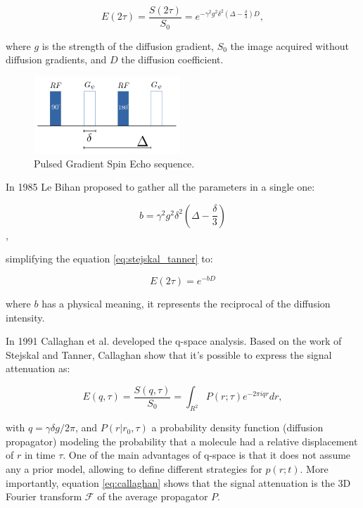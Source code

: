 \begin{equation}
    E(2\tau) = 
    \frac{S(2\tau)}{S_0} =
    e^{-\gamma^2 g^2 \delta^2 \left(\Delta - \frac{\delta}{3}\right) D},
\label{eq:stejskal_tanner}
\end{equation}

where $g$ is the strength of the diffusion gradient, $S_0$ the
image acquired without diffusion gradients, and $D$ the diffusion coefficient.

\begin{figure}
    \includegraphics[width=0.49\textwidth]{3.mri/img/fgp.png}
    \caption{Pulsed Gradient Spin Echo sequence.}
    \label{fig:fgp}
\end{figure}  

In 1985 Le Bihan \cite{LEBIHAN} proposed to gather all the parameters in a
single one: 

$$ b = \gamma^2 g^2 \delta^2 \left(\Delta - \frac{\delta}{3}\right) $$ ,

simplifying the equation \ref{eq:stejskal_tanner} to:

$$ E(2\tau) = e^{-b D} $$

where $b$ has a physical meaning, it represents the reciprocal of the diffusion
intensity\cite{LEBIHAN}.

In 1991 Callaghan et al. \cite{Callaghan1991} developed the q-space analysis.
Based on the work of Stejskal and Tanner, Callaghan show that it's possible
to express the signal attenuation as:

\begin{equation}
\label{eq:callaghan}
E(q,\tau) =  \frac{S(q,\tau)}{S_0} = \int_{R^2}{P(r;\tau)e^{-2\pi i q r} dr},
\end{equation}

with $q =  \gamma \delta g / 2\pi$, and $P(r|r_0, \tau)$ a probability density
function (diffusion propagator) modeling the probability that a molecule had a
relative displacement of $r$ in time $\tau$. One of the main advantages of
q-space is that it does not assume any a prior model, allowing to define 
different strategies for $p(r;t)$. More importantly, equation
\ref{eq:callaghan} shows that the signal attenuation is the 3D Fourier
transform $\mathcal{F}$ of the average propagator $P$. 

